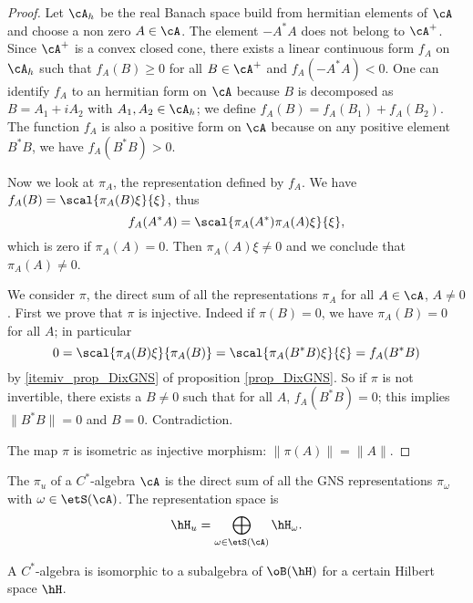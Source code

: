 \begin{proof}
Let $\cA_h$ be the real Banach space build from hermitian elements of $\cA$ and choose a non zero $A\in\cA$. The element $-A^*A$ does not belong to $\cA^+$. Since $\cA^+$ is a convex closed cone, there exists a linear continuous form $f_A$ on $\cA_h$ such that $f_A(B)\geq 0$ for all $B\in\cA^+$ and $f_A(-A^*A)<0$. One can identify $f_A$ to an hermitian form on $\cA$ because $B$ is decomposed as $B=A_1+iA_2$ with $A_1,A_2\in\cA_h$; we define $f_A(B)=f_A(B_1)+f_A(B_2)$. The function $f_A$ is also a positive form on $\cA$ because on any positive element $B^*B$, we have $f_A(B^*B)>0$.

Now we look at $\pi_A$, the representation defined by $f_A$. We have $f_A(B)=\scal{ \pi_A(B)\xi }{ \xi }$, thus
\[ 
  f_A(A^*A)=\scal{ \pi_A(A^*)\pi_A(A)\xi }{ \xi },
\]
which is zero if $\pi_A(A)=0$. Then $\pi_A(A)\xi\neq 0$ and we conclude that $\pi_A(A)\neq 0$.

We consider $\pi$, the direct sum of all the representations $\pi_A$ for all $A\in\cA$, $A\neq 0$. First we prove that $\pi$ is injective. Indeed if $\pi(B)=0$, we have $\pi_A(B)=0$ for all $A$; in particular 
\begin{equation}
  0=\scal{ \pi_A(B)\xi }{ \pi_A(B) }
        =\scal{ \pi_A(B^*B)\xi }{ \xi }
        =f_A(B^*B)
\end{equation}
by \ref{itemiv_prop_DixGNS} of proposition \ref{prop_DixGNS}. So if $\pi$ is not invertible, there exists a $B\neq 0$ such that for all $A$, $f_A(B^*B)=0$; this implies $\| B^*B \|=0$ and $B=0$. Contradiction.

The map $\pi$ is isometric as injective morphism: $\| \pi(A) \|=\| A \|$.
\end{proof}


The  $\pi_u$ of a $C^*$-algebra $\cA$ is the direct sum of all the GNS representations $\pi_{\omega}$ with $\omega\in\etS(\cA)$. The representation space is 
\[ 
  \hH_u=\bigoplus_{\omega\in\etS(\cA)}\hH_{\omega}.
\]


\begin{theorem}
A $C^*$-algebra is isomorphic to a subalgebra of $\oB(\hH)$ for a certain Hilbert space $\hH$.
\end{theorem}

